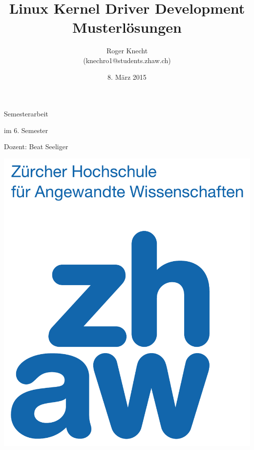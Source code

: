 \title{Linux Kernel Driver Development \\ \vspace{1.0cm} \huge Musterlösungen}
\date{8. März 2015}
\author{Roger Knecht \\ (knechro1@students.zhaw.ch)}

\sffamily
\maketitle
\vfill
\begin{center}
	Semesterarbeit

	\vspace{0.5cm}
	\Large
	\normalsize

	im 6. Semester
	
	\vspace{0.5cm}
	Dozent: Beat Seeliger 
	\vfill
	\vspace{0.7cm}
   \begin{center}
   	\includegraphics[scale=0.2]{images/zhaw}
   \end{center}
	\vfill


\end{center}
